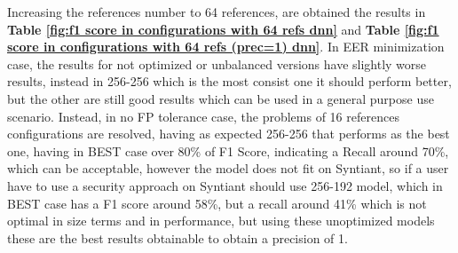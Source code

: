 Increasing the references number to 64 references, are obtained the results in \textbf{Table \ref{fig:f1 score in configurations with 64 refs dnn}} and \textbf{Table \ref{fig:f1 score in configurations with 64 refs (prec=1) dnn}}. In EER minimization case, the results for not optimized or unbalanced versions have slightly worse results, instead in 256-256 which is the most consist one it should perform better, 
but the other are still good results which can be used in a general purpose use scenario. Instead, in no FP tolerance case, the problems of 16 references configurations are resolved, having as expected 256-256 that performs as the best one, having in BEST case over 80\% of F1 Score, indicating a Recall around 70\%, which can be acceptable, however the model does not fit on Syntiant, so if a user have to use a security approach on Syntiant should use 256-192 model, which in BEST case has a F1 score around 58\%, but a recall around 41\% which is not optimal in size terms and in performance, but using these unoptimized models these are the best results obtainable to obtain a precision of 1.

